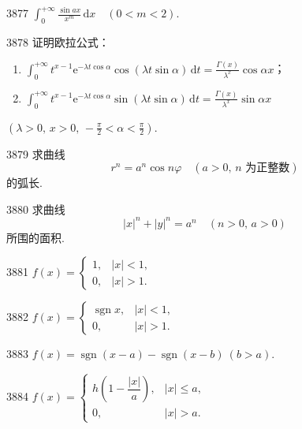 \begin{prob}[S]{3877}
$\displaystyle \int_0^{+\infty} \frac{\sin ax}{x^m}\,\mathrm{d}x \quad (0<m<2)$.
\end{prob}

\begin{prob}[M]{3878}
证明欧拉公式：
\begin{enumerate}[label=(\alph*), itemsep=2pt, topsep=3pt]
\item $\displaystyle \int_0^{+\infty} t^{x-1}\mathrm{e}^{-\lambda t\cos\alpha}\cos(\lambda t\sin\alpha)\,\mathrm{d}t = \frac{\Gamma(x)}{\lambda^x}\cos\alpha x$；
\item $\displaystyle \int_0^{+\infty} t^{x-1}\mathrm{e}^{-\lambda t\cos\alpha}\sin(\lambda t\sin\alpha)\,\mathrm{d}t = \frac{\Gamma(x)}{\lambda^x}\sin\alpha x$
\end{enumerate}
$\left(\lambda>0,\, x>0,\, -\frac{\pi}{2}<\alpha<\frac{\pi}{2}\right)$.
\end{prob}

\begin{prob}[M]{3879}
求曲线
\[
r^n = a^n \cos n\varphi \quad (a>0,\, n \text{ 为正整数})
\]
的弧长.
\end{prob}

\begin{prob}[M]{3880}
求曲线
\[
|x|^n + |y|^n = a^n \quad (n>0,\, a>0)
\]
所围的面积.
\end{prob}



\begin{prob}[S]{3881}
$f(x) = \begin{cases} 1, & |x| < 1, \\ 0, & |x| > 1. \end{cases}$
\end{prob}

\begin{prob}[S]{3882}
$f(x) = \begin{cases} \operatorname{sgn} x, & |x| < 1, \\ 0, & |x| > 1. \end{cases}$
\end{prob}

\begin{prob}[S]{3883}
$f(x) = \operatorname{sgn}(x - a) - \operatorname{sgn}(x - b)\ (b > a).$
\end{prob}

\begin{prob}[S]{3884}
$f(x) = \begin{cases} h\left(1 - \dfrac{|x|}{a}\right), & |x| \leqslant a, \\ 0, & |x| > a. \end{cases}$
\end{prob}

